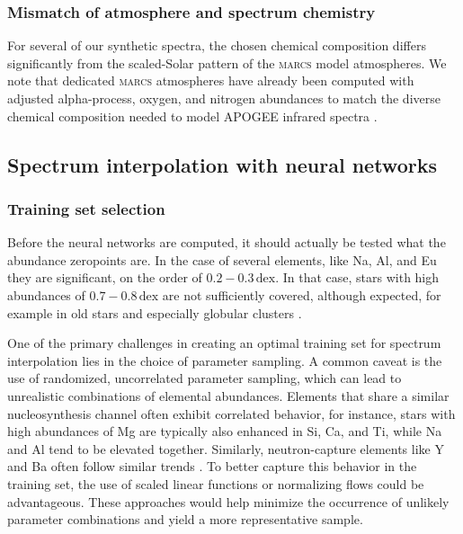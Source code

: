 \documentclass[
  journal=pasa,
  manuscript=research-paper, %
  year=2024,
  volume=37
]{cup-journal}
\newcommand{\marcs}{\textsc{marcs}\xspace}
\begin{document}
\subsubsection{Mismatch of atmosphere and spectrum chemistry}

For several of our synthetic spectra, the chosen chemical composition differs significantly from the scaled-Solar pattern of the \marcs model atmospheres. We note that dedicated \marcs atmospheres have already been computed with adjusted alpha-process, oxygen, and nitrogen abundances to match the diverse chemical composition needed to model APOGEE infrared spectra \citep{SDSSDR17}.

\subsection{Spectrum interpolation with neural networks} \label{sec:caveats_interpolation}

\subsubsection{Training set selection}

Before the neural networks are computed, it should actually be tested what the abundance zeropoints are. In the case of several elements, like Na, Al, and Eu they are significant, on the order of $0.2-0.3\,\mathrm{dex}$. In that case, stars with high abundances of $0.7-0.8\,\mathrm{dex}$ are not sufficiently covered, although expected, for example in old stars and especially globular clusters \citep[see e.g.][]{Carretta2009}.

One of the primary challenges in creating an optimal training set for spectrum interpolation lies in the choice of parameter sampling. A common caveat is the use of randomized, uncorrelated parameter sampling, which can lead to unrealistic combinations of elemental abundances. Elements that share a similar nucleosynthesis channel often exhibit correlated behavior, for instance, stars with high abundances of Mg are typically also enhanced in Si, Ca, and Ti, while Na and Al tend to be elevated together. Similarly, neutron-capture elements like Y and Ba often follow similar trends \citep[e.g.][]{Ting2012, Kobayashi2020, Buder2021}. To better capture this behavior in the training set, the use of scaled linear functions or normalizing flows could be advantageous. These approaches would help minimize the occurrence of unlikely parameter combinations and yield a more representative sample. 
\end{document}
